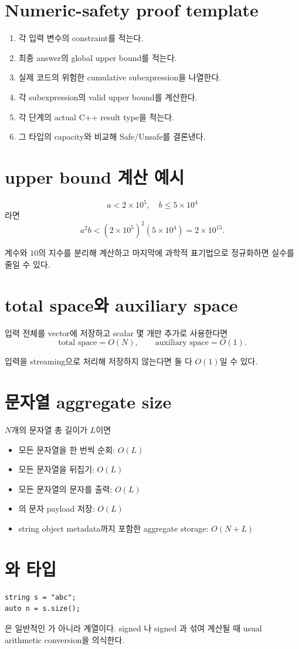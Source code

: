 \section{Numeric-safety proof template}
\begin{enumerate}
  \item 각 입력 변수의 constraint를 적는다.
  \item 최종 answer의 global upper bound를 적는다.
  \item 실제 코드의 위험한 cumulative subexpression을 나열한다.
  \item 각 subexpression의 valid upper bound를 계산한다.
  \item 각 단계의 actual C++ result type을 적는다.
  \item 그 타입의 capacity와 비교해 Safe/Unsafe를 결론낸다.
\end{enumerate}

\section{upper bound 계산 예시}
\[
a<2\times10^5,\quad b\le5\times10^4
\]
라면
\[
a^2b
<(2\times10^5)^2(5\times10^4)
=2\times10^{15}.
\]

계수와 $10$의 지수를 분리해 계산하고 마지막에 과학적 표기법으로 정규화하면 실수를 줄일 수 있다.

\section{total space와 auxiliary space}
입력 전체를 vector에 저장하고 scalar 몇 개만 추가로 사용한다면
\[
\text{total space}=O(N),\qquad
\text{auxiliary space}=O(1).
\]

입력을 streaming으로 처리해 저장하지 않는다면 둘 다 $O(1)$일 수 있다.

\section{문자열 aggregate size}
$N$개의 문자열 총 길이가 $L$이면
\begin{itemize}
  \item 모든 문자열을 한 번씩 순회: $O(L)$
  \item 모든 문자열을 뒤집기: $O(L)$
  \item 모든 문자열의 문자를 출력: $O(L)$
  \item {}의 문자 payload 저장: $O(L)$
  \item string object metadata까지 포함한 aggregate storage: $O(N+L)$
\end{itemize}

\section{와 타입}
\begin{lstlisting}
string s = "abc";
auto n = s.size();
\end{lstlisting}

은 일반적인 가 아니라  계열이다. signed 나 signed 과 섞여 계산될 때 usual arithmetic conversion을 의식한다.
